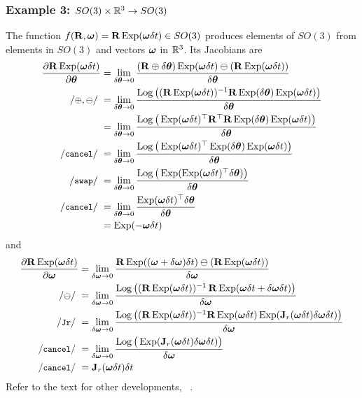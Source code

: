 \subsubsection{Example 3: $SO(3)\times{\mathbb R}^3\to SO(3)$} 

The function $f({\bf R},{{\bm \omega}}) = {\bf R}\operatorname*{Exp}({{\bm \omega}}\delta t)\in SO(3)$ produces elements of $SO(3)$ from elements in $SO(3)$ and vectors ${{\bm \omega}}$ in ${\mathbb R}^3$. Its Jacobians are 
%
\begin{align*}
\dpar{\bfR\Exp(\bw\dt)}{\bth} 
&= \lim_{\delta\bth\to0}\frac{(\bfR\oplus\delta\bth)\Exp(\bw\dt)\ominus(\bfR\Exp(\bw\dt))}{\delta\bth} \\
\com{$\oplus,\ominus$}
&= \lim_{\delta\bth\to0}\frac{\Log\big((\bfR\Exp(\bw\dt))\inv \bfR\Exp(\delta\bth)\Exp(\bw\dt)\big)}{\delta\bth} \\
&= \lim_{\delta\bth\to0}\frac{\Log\big(\Exp(\bw\dt)\tr\bfR\tr \bfR\Exp(\delta\bth)\Exp(\bw\dt)\big)}{\delta\bth} \\
\ccancel
&= \lim_{\delta\bth\to0}\frac{\Log\big(\Exp(\bw\dt)\tr\Exp(\delta\bth)\Exp(\bw\dt)\big)}{\delta\bth} \\
\cswap
&= \lim_{\delta\bth\to0}\frac{\Log\big(\Exp(\Exp(\bw\dt)\tr\delta\bth)\big)}{\delta\bth} \\
\ccancel
&= \lim_{\delta\bth\to0}\frac{\Exp(\bw\dt)\tr\delta\bth}{\delta\bth} \\
&= \Exp(-\bw\dt) 
\end{align*}
%
and
%
\begin{align*}
\dpar{\bfR\Exp(\bw\dt)}{\bw} 
&= \lim_{\delta\bw\to0}\frac{\bfR\Exp((\bw+\delta\bw)\dt) \ominus (\bfR\Exp(\bw\dt)) }{\delta\bw} \\
\com{$\ominus$}
&= \lim_{\delta\bw\to0}\frac{\Log\big((\bfR\Exp(\bw\dt))\inv \, \bfR\Exp(\bw\dt+\delta\bw\dt)\big)}{\delta\bw} \\
\cJr
&= \lim_{\delta\bw\to0}\frac{\Log\big((\bfR\Exp(\bw\dt))\inv \bfR\Exp(\bw\dt)\Exp(\bfJ_r(\bw\dt)\delta\bw\dt)\big)}{\delta\bw} \\
\ccancel
&= \lim_{\delta\bw\to0}\frac{\Log\big(\Exp(\bfJ_r(\bw\dt)\delta\bw\dt)\big)}{\delta\bw} \\
\com{cancel}
&= \bfJ_r(\bw\dt)\dt
\end{align*}
%
%
Refer to the text for other developments, \eg~.



